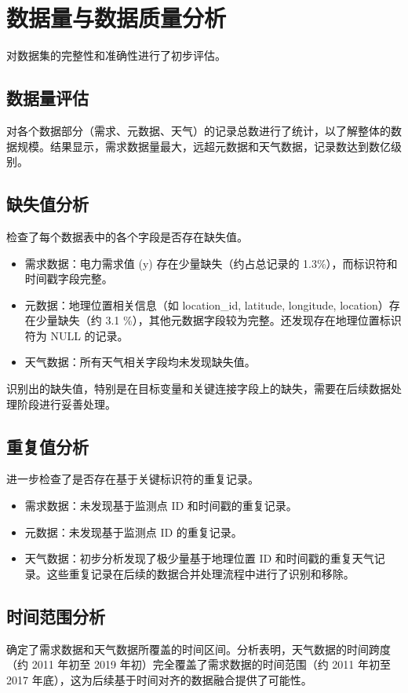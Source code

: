 \documentclass{article} %
\begin{document}
\section{数据量与数据质量分析}
\label{sec:data_quality}

对数据集的完整性和准确性进行了初步评估。

\subsection{数据量评估}
\label{subsec:data_volume}
对各个数据部分（需求、元数据、天气）的记录总数进行了统计，以了解整体的数据规模。结果显示，需求数据量最大，远超元数据和天气数据，记录数达到数亿级别。

\subsection{缺失值分析}
\label{subsec:missing_values}
检查了每个数据表中的各个字段是否存在缺失值。
\begin{itemize}
    \item 需求数据：电力需求值 (y) 存在少量缺失（约占总记录的 1.3\%），而标识符和时间戳字段完整。
    \item 元数据：地理位置相关信息（如 location\_id, latitude, longitude, location）存在少量缺失（约 3.1 \%），其他元数据字段较为完整。还发现存在地理位置标识符为 NULL 的记录。
    \item 天气数据：所有天气相关字段均未发现缺失值。
\end{itemize}
识别出的缺失值，特别是在目标变量和关键连接字段上的缺失，需要在后续数据处理阶段进行妥善处理。

\subsection{重复值分析}
\label{subsec:duplicate_values}
进一步检查了是否存在基于关键标识符的重复记录。
\begin{itemize}
    \item 需求数据：未发现基于监测点 ID 和时间戳的重复记录。
    \item 元数据：未发现基于监测点 ID 的重复记录。
    \item 天气数据：初步分析发现了极少量基于地理位置 ID 和时间戳的重复天气记录。这些重复记录在后续的数据合并处理流程中进行了识别和移除。
\end{itemize}

\subsection{时间范围分析}
\label{subsec:time_range}
确定了需求数据和天气数据所覆盖的时间区间。分析表明，天气数据的时间跨度（约 2011 年初至 2019 年初）完全覆盖了需求数据的时间范围（约 2011 年初至 2017 年底），这为后续基于时间对齐的数据融合提供了可能性。
\end{document}
